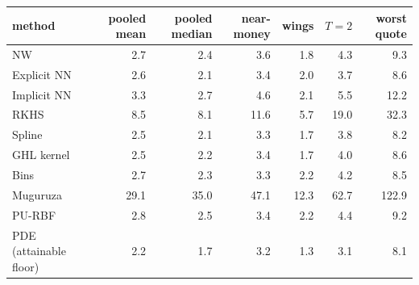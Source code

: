 \begin{tabular}{l rrrrrr}
\toprule
method & pooled mean & pooled median & near-money & wings & $T=2$ & worst quote\\
\midrule
NW & 2.7 & 2.4 & 3.6 & 1.8 & 4.3 & 9.3\\
Explicit NN & 2.6 & 2.1 & 3.4 & 2.0 & 3.7 & 8.6\\
Implicit NN & 3.3 & 2.7 & 4.6 & 2.1 & 5.5 & 12.2\\
RKHS & 8.5 & 8.1 & 11.6 & 5.7 & 19.0 & 32.3\\
Spline & 2.5 & 2.1 & 3.3 & 1.7 & 3.8 & 8.2\\
GHL kernel & 2.5 & 2.2 & 3.4 & 1.7 & 4.0 & 8.6\\
Bins & 2.7 & 2.3 & 3.3 & 2.2 & 4.2 & 8.5\\
Muguruza & 29.1 & 35.0 & 47.1 & 12.3 & 62.7 & 122.9\\
PU-RBF & 2.8 & 2.5 & 3.4 & 2.2 & 4.4 & 9.2\\
PDE (attainable floor) & 2.2 & 1.7 & 3.2 & 1.3 & 3.1 & 8.1\\
\bottomrule
\end{tabular}

